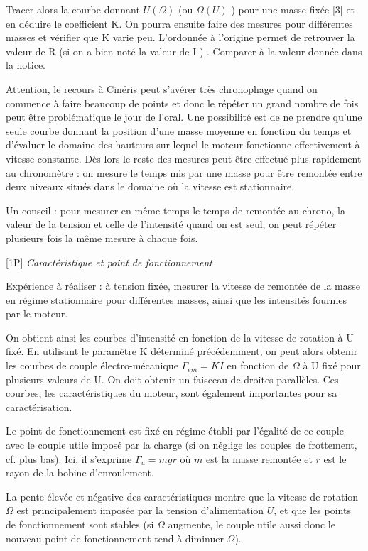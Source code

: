 \documentclass{article}%
\begin{document}
Tracer alors la courbe donnant $U (\Omega)$ (ou $\Omega(U)$ ) pour une masse fixée [3] et en déduire le coefficient K. On pourra ensuite faire des mesures pour différentes masses et vérifier que K varie peu. L'ordonnée à l'origine permet de retrouver la valeur de R (si on a bien noté la valeur de I ) . Comparer à la valeur donnée dans la notice.

Attention, le recours à Cinéris peut s'avérer très chronophage quand on commence à faire beaucoup de points et donc le répéter un grand nombre de fois peut être problématique le jour de l'oral. Une possibilité est de ne prendre qu'une seule courbe donnant la position d'une masse moyenne en fonction du temps et d'évaluer le domaine des hauteurs sur lequel le moteur fonctionne effectivement à vitesse constante. Dès lors le reste des mesures peut être effectué plus rapidement au chronomètre : on mesure le temps mis par une masse pour être remontée entre deux niveaux situés dans le domaine où la vitesse est stationnaire.

Un conseil : pour mesurer en même temps le temps de remontée au chrono, la valeur de la tension et celle de l'intensité quand on est seul, on peut répéter plusieurs fois la même mesure à chaque fois.

[1P] \textit{Caractéristique et point de fonctionnement}

Expérience à réaliser : à tension fixée, mesurer la vitesse de remontée de la masse en régime stationnaire pour différentes masses, ainsi que les intensités fournies par le moteur.

On obtient ainsi les courbes d'intensité en fonction de la vitesse de rotation à U fixé. En utilisant le paramètre K déterminé précédemment, on peut alors obtenir les courbes de couple électro-mécanique $\Gamma_{em} = K I$ en fonction de $\Omega$ à U fixé pour plusieurs valeurs de U. On doit obtenir un faisceau de droites parallèles. Ces courbes, les caractéristiques du moteur, sont également importantes pour sa caractérisation.

Le point de fonctionnement est fixé en régime établi par l'égalité de ce couple avec le couple utile imposé par la charge (si on néglige les couples de frottement, cf. plus bas). Ici, il s'exprime $\Gamma_u = m g r$ où $m$ est la masse remontée et $r$ est le rayon de la bobine d'enroulement.

La pente élevée et négative des caractéristiques montre que la vitesse de rotation $\Omega$ est principalement imposée par la tension d'alimentation $U$, et que les points de fonctionnement sont stables (si $\Omega$ augmente, le couple utile aussi donc le nouveau point de fonctionnement tend à diminuer $\Omega$).
\end{document}
